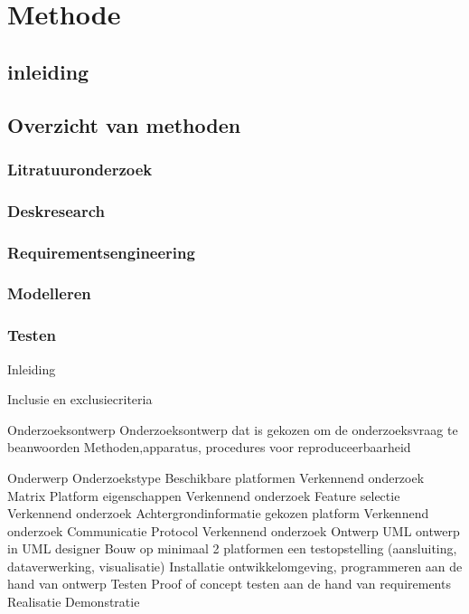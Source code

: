\newpage
\section{Methode}

\subsection{inleiding}

\subsection{Overzicht van methoden}

\subsubsection{Litratuuronderzoek}
 
 \subsubsection{Deskresearch}
 
 \subsubsection{Requirementsengineering}
 
\subsubsection{Modelleren}


\subsubsection{Testen}


Inleiding

Inclusie en exclusiecriteria

Onderzoeksontwerp
Onderzoeksontwerp dat is gekozen om de onderzoeksvraag te beanwoorden
Methoden,apparatus, procedures voor reproduceerbaarheid


Onderwerp
Onderzoekstype
Beschikbare platformen
Verkennend onderzoek
Matrix Platform eigenschappen
Verkennend onderzoek
Feature selectie
Verkennend onderzoek
Achtergrondinformatie gekozen platform
Verkennend onderzoek
Communicatie Protocol
Verkennend onderzoek
Ontwerp
UML ontwerp in UML designer
Bouw op minimaal 2 platformen een testopstelling (aansluiting, dataverwerking, visualisatie) 
Installatie ontwikkelomgeving, programmeren aan de hand van ontwerp
Testen 
Proof of concept testen aan de hand van requirements
Realisatie
Demonstratie


